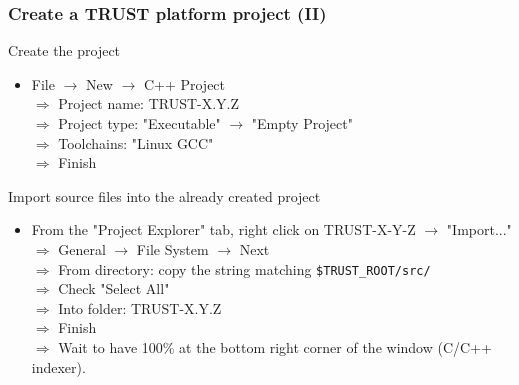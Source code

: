 \documentclass[10pt, hyperref={unicode=true,pdfusetitle, bookmarks=true,bookmarksnumbered=false,bookmarksopen=false, breaklinks=false,pdfborder={0 0 1},backref=true,colorlinks=true,linkcolor=darkblue,pageanchor, urlcolor=darkblue}]{beamer}
\begin{document}
\begin{frame}
\frametitle{Create a TRUST platform project (II)}

\begin{exampleblock}{Create the project}
\begin{itemize}
\item File $\rightarrow$ New  $\rightarrow$  C++ Project \\
 $\Rightarrow$ Project name: TRUST-X.Y.Z \\
 $\Rightarrow$ Project type: "Executable"  $\rightarrow$  "Empty Project" \\
 $\Rightarrow$ Toolchains: "Linux GCC" \\
 $\Rightarrow$ Finish
\end{itemize}
\end{exampleblock}

\begin{exampleblock}{Import source files into the already created project}
\begin{itemize}
\item From the "Project Explorer" tab, right click on TRUST-X-Y-Z  $\rightarrow$  "Import..." \\
  $\Rightarrow$ General  $\rightarrow$ File System $\rightarrow$ Next \\
  $\Rightarrow$ From directory: copy the string matching \texttt{\$TRUST\_ROOT/src/} \\
  $\Rightarrow$ Check "Select All" \\
  $\Rightarrow$ Into folder: TRUST-X.Y.Z \\
  $\Rightarrow$ Finish \\
  $\Rightarrow$ Wait to have 100\% at the bottom right corner of the window  (C/C++ indexer).
\end{itemize}
\end{exampleblock}

\end{frame}
\end{document}
